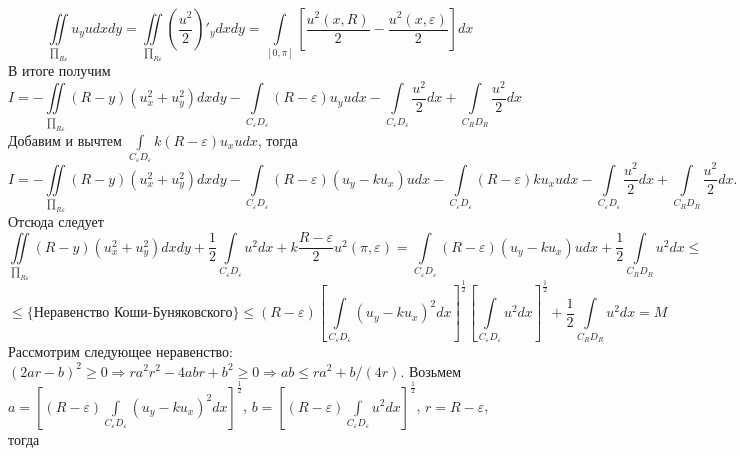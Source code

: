 \documentclass[9pt]{article}
\begin{document}
	\begin{equation*}
		\iint\limits_{\prod_{R\varepsilon}} u_y u dx dy = \iint\limits_{\prod_{R\varepsilon}} \left(\dfrac{u^2}{2}\right)'_ydx dy = \int\limits_{[0,\pi]} \left[\dfrac{u^2(x,R)}{2} - \dfrac{u^2(x, \varepsilon)}{2}\right] dx 
	\end{equation*}
	В итоге получим 
	\begin{equation*}
		I = - \iint\limits_{\prod_{R\varepsilon}} \left(R - y\right) \left(u_x^2 + u_y^2\right) dx dy
		- \int\limits_{C_\varepsilon D_\varepsilon} \left(R - \varepsilon\right) u_y u dx 
		-\int\limits_{C_\varepsilon D_\varepsilon} \dfrac{u^2}{2} dx + \int\limits_{C_R D_R} \dfrac{u^2}{2} dx 
	\end{equation*}
	Добавим и вычтем $\int\limits_{C_\varepsilon D_\varepsilon} k\left(R - \varepsilon\right) u_x u dx$, тогда
	\begin{equation*}
		I = - \iint\limits_{\prod_{R\varepsilon}} \left(R - y\right) \left(u_x^2 + u_y^2\right) dx dy - 
		\int\limits_{C_\varepsilon D_\varepsilon} \left(R - \varepsilon \right) \left(u_y - ku_x\right)u dx - \int\limits_{C_\varepsilon D_\varepsilon} \left(R - \varepsilon\right) k u_x u dx - \int\limits_{C_\varepsilon D_\varepsilon}\dfrac{u^2}{2} dx + \int\limits_{C_R D_R} \dfrac{u^2}{2}dx.
	\end{equation*}
	Отсюда следует
	\begin{equation*}
		\iint\limits_{\prod_{R\varepsilon}} \left(R - y\right) \left(u_x^2 + u_y^2\right) dx dy + \dfrac{1}{2}\int\limits_{C_\varepsilon D_\varepsilon} u^2 dx +k\dfrac{R - \varepsilon}{2}u^2(\pi, \varepsilon)  =\int\limits_{C_\varepsilon D_\varepsilon} \left(R - \varepsilon \right) \left(u_y - ku_x\right)u dx + \dfrac12  \int\limits_{C_R D_R} u^2 dx \leq 
	\end{equation*}
	\begin{equation*}
		\leq \{ \text{Неравенство Коши-Буняковского} \} \leq \left(R - \varepsilon\right) \left[\int\limits_{C_\varepsilon D_\varepsilon} \left( u_y - ku_x\right)^2 dx \right]^{\frac12} \left[\int\limits_{C_\varepsilon D_\varepsilon} u^2 dx \right]^{\frac12} + \dfrac12 \int\limits_{C_RD_R} u^2 dx = M
	\end{equation*}
	Рассмотрим следующее неравенство: $(2ar - b)^2 \geq 0 \Rightarrow ra^2r^2 - 4abr + b^2 \geq 0 \Rightarrow ab \leq ra^2 + b/ (4r)$. Возьмем $a =  \left[\left(R - \varepsilon\right)\int\limits_{C_\varepsilon D_\varepsilon} \left( u_y - ku_x\right)^2 dx \right]^{\frac12}$, $b = \left[\left(R - \varepsilon\right)\int\limits_{C_\varepsilon D_\varepsilon} u^2 dx \right]^{\frac12}$, $r = R - \varepsilon$, тогда
\end{document}
